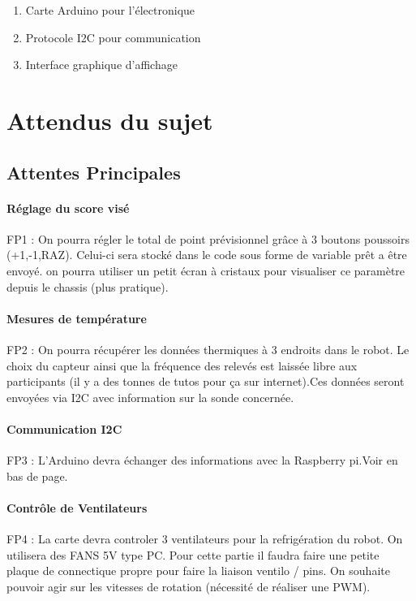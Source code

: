 \documentclass[fleqn,10pt]{SelfArx} %
\begin{document}
\begin{enumerate}[noitemsep] %
\item Carte Arduino pour l'électronique
\item Protocole I2C pour communication
\item Interface graphique d'affichage
\end{enumerate}

\section{Attendus du sujet}
\subsection{Attentes Principales}

\paragraph{Réglage du score visé}
FP1 : On pourra régler le total de point prévisionnel grâce à 3 boutons poussoirs (+1,-1,RAZ). Celui-ci sera stocké dans le code sous forme de variable prêt a être envoyé. on pourra utiliser un petit écran à cristaux pour visualiser ce paramètre depuis le chassis (plus pratique).
\paragraph{Mesures de température}
FP2 : On pourra récupérer les données thermiques à 3 endroits dans le robot. Le choix du capteur ainsi que la fréquence des relevés est laissée libre aux participants (il y a des tonnes de tutos pour ça sur internet).Ces données seront envoyées via I2C avec information sur la sonde concernée.
\paragraph{Communication I2C}
FP3 : L'Arduino devra échanger des informations avec la Raspberry pi.Voir en bas de page.
\paragraph{Contrôle de Ventilateurs}
FP4 : La carte devra controler 3 ventilateurs pour la refrigération du robot. On utilisera des FANS 5V type PC. Pour cette partie il faudra faire une petite plaque de connectique propre pour faire la liaison ventilo / pins. On souhaite pouvoir agir sur les vitesses de rotation (nécessité de réaliser une PWM).
\end{document}
